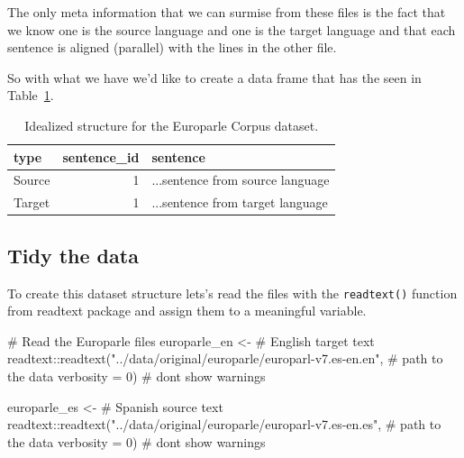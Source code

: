 \documentclass[
  letterpaper,
]{latex/krantz}
\newenvironment{Shaded}{\begin{snugshade}}{\end{snugshade}}
\newcommand{\AttributeTok}[1]{\textcolor[rgb]{0.40,0.45,0.13}{#1}}
\newcommand{\CommentTok}[1]{\textcolor[rgb]{0.37,0.37,0.37}{#1}}
\newcommand{\DecValTok}[1]{\textcolor[rgb]{0.68,0.00,0.00}{#1}}
\newcommand{\FunctionTok}[1]{\textcolor[rgb]{0.28,0.35,0.67}{#1}}
\newcommand{\NormalTok}[1]{\textcolor[rgb]{0.00,0.23,0.31}{#1}}
\newcommand{\OtherTok}[1]{\textcolor[rgb]{0.00,0.23,0.31}{#1}}
\newcommand{\SpecialCharTok}[1]{\textcolor[rgb]{0.37,0.37,0.37}{#1}}
\newcommand{\StringTok}[1]{\textcolor[rgb]{0.13,0.47,0.30}{#1}}
\begin{document}
The only meta information that we can surmise from these files is the
fact that we know one is the source language and one is the target
language and that each sentence is aligned (parallel) with the lines in
the other file.

So with what we have we'd like to create a data frame that has the seen
in Table~\ref{tbl-cd-unstructured-europarle-structure-example}.

\hypertarget{tbl-cd-unstructured-europarle-structure-example}{}
\begin{table}
\caption{\label{tbl-cd-unstructured-europarle-structure-example}Idealized structure for the Europarle Corpus dataset. }\tabularnewline

\centering
\begin{tabular}{lrl}
\toprule
type & sentence\_id & sentence\\
\midrule
Source & 1 & ...sentence from source language\\
Target & 1 & ...sentence from target language\\
\bottomrule
\end{tabular}
\end{table}

\hypertarget{tidy-the-data}{%
\subsection{Tidy the data}\label{tidy-the-data}}

To create this dataset structure lets's read the files with the
\texttt{readtext()} function from readtext package and assign them to a
meaningful variable.

\begin{Shaded}
\begin{Highlighting}[]
\CommentTok{\# Read the Europarle files}
\NormalTok{europarle\_en }\OtherTok{\textless{}{-}}  \CommentTok{\# English target text}
\NormalTok{  readtext}\SpecialCharTok{::}\FunctionTok{readtext}\NormalTok{(}\StringTok{"../data/original/europarle/europarl{-}v7.es{-}en.en"}\NormalTok{, }\CommentTok{\# path to the data}
                     \AttributeTok{verbosity =} \DecValTok{0}\NormalTok{) }\CommentTok{\# don\textquotesingle{}t show warnings}

\NormalTok{europarle\_es }\OtherTok{\textless{}{-}} \CommentTok{\# Spanish source text}
\NormalTok{  readtext}\SpecialCharTok{::}\FunctionTok{readtext}\NormalTok{(}\StringTok{"../data/original/europarle/europarl{-}v7.es{-}en.es"}\NormalTok{, }\CommentTok{\# path to the data}
                     \AttributeTok{verbosity =} \DecValTok{0}\NormalTok{) }\CommentTok{\# don\textquotesingle{}t show warnings}
\end{Highlighting}
\end{Shaded}
\end{document}
